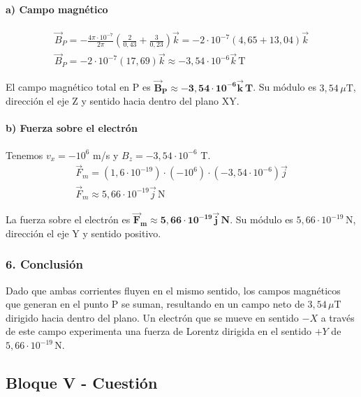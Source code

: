 \paragraph{a) Campo magnético}
\begin{gather}
    \vec{B}_P = -\frac{4\pi\cdot10^{-7}}{2\pi}\left( \frac{2}{0,43} + \frac{3}{0,23} \right)\vec{k} = -2\cdot10^{-7} (4,65 + 13,04)\vec{k} \nonumber \\
    \vec{B}_P = -2\cdot10^{-7} (17,69)\vec{k} \approx -3,54 \cdot 10^{-6} \vec{k} \, \text{T}
\end{gather}
\begin{cajaresultado}
El campo magnético total en P es $\boldsymbol{\vec{B}_P \approx -3,54 \cdot 10^{-6} \vec{k} \, \textbf{T}}$. Su módulo es $3,54\,\mu\text{T}$, dirección el eje Z y sentido hacia dentro del plano XY.
\end{cajaresultado}

\paragraph{b) Fuerza sobre el electrón}
Tenemos $v_x = -10^6$ m/s y $B_z = -3,54 \cdot 10^{-6}$ T.
\begin{gather}
    \vec{F}_m = (1,6\cdot10^{-19}) \cdot (-10^6) \cdot (-3,54 \cdot 10^{-6}) \vec{j} \nonumber \\
    \vec{F}_m \approx 5,66 \cdot 10^{-19} \vec{j} \, \text{N}
\end{gather}
\begin{cajaresultado}
La fuerza sobre el electrón es $\boldsymbol{\vec{F}_m \approx 5,66 \cdot 10^{-19} \vec{j} \, \textbf{N}}$. Su módulo es $5,66 \cdot 10^{-19}\,\text{N}$, dirección el eje Y y sentido positivo.
\end{cajaresultado}

\subsubsection*{6. Conclusión}
\begin{cajaconclusion}
Dado que ambas corrientes fluyen en el mismo sentido, los campos magnéticos que generan en el punto P se suman, resultando en un campo neto de $3,54\,\mu\text{T}$ dirigido hacia dentro del plano. Un electrón que se mueve en sentido $-X$ a través de este campo experimenta una fuerza de Lorentz dirigida en el sentido $+Y$ de $5,66 \cdot 10^{-19}\,\text{N}$.
\end{cajaconclusion}

\newpage
\subsection{Bloque V - Cuestión}
\label{subsec:V_B_2013_jun_ord}

